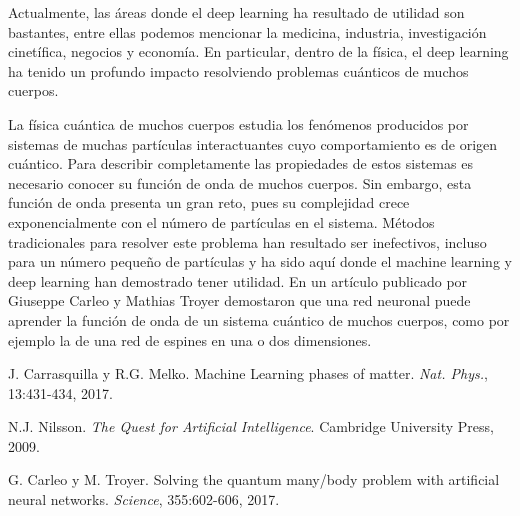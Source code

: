 \documentclass[12pt,oneside,openany]{memoir}
\begin{document}
Actualmente, las áreas donde el deep learning ha resultado de utilidad son bastantes, entre ellas podemos mencionar la medicina, industria, investigación cinetífica, negocios y economía. En particular, dentro de la física, el deep learning ha tenido un profundo impacto resolviendo problemas cuánticos de muchos cuerpos. 

La física cuántica de muchos cuerpos estudia los fenómenos producidos por sistemas de muchas partículas interactuantes cuyo comportamiento es de origen cuántico. Para describir completamente las propiedades de estos sistemas es necesario conocer su función de onda de muchos cuerpos. Sin embargo, esta función de onda presenta un gran reto, pues su complejidad crece exponencialmente con el número de partículas en el sistema. Métodos tradicionales para resolver este problema han resultado ser inefectivos, incluso para un número pequeño de partículas y ha sido aquí donde el machine learning y deep learning han demostrado tener utilidad. En un artículo publicado por Giuseppe Carleo y Mathias Troyer \cite{Carleo17}  demostaron que una red neuronal puede aprender la función de onda de un sistema cuántico de muchos cuerpos, como por ejemplo la de una red de espines en una o dos dimensiones.



\begin{thebibliography}{9}
J. Carrasquilla y R.G. Melko. Machine Learning phases of matter. \textit{Nat. Phys.}, 13:431-434, 2017.

N.J. Nilsson. \textit{The Quest for Artificial Intelligence}. Cambridge University Press, 2009.

G. Carleo y M. Troyer. Solving the quantum many/body problem with artificial neural networks. \textit{Science}, 355:602-606, 2017.
 
% 
\end{thebibliography}
\end{document}
